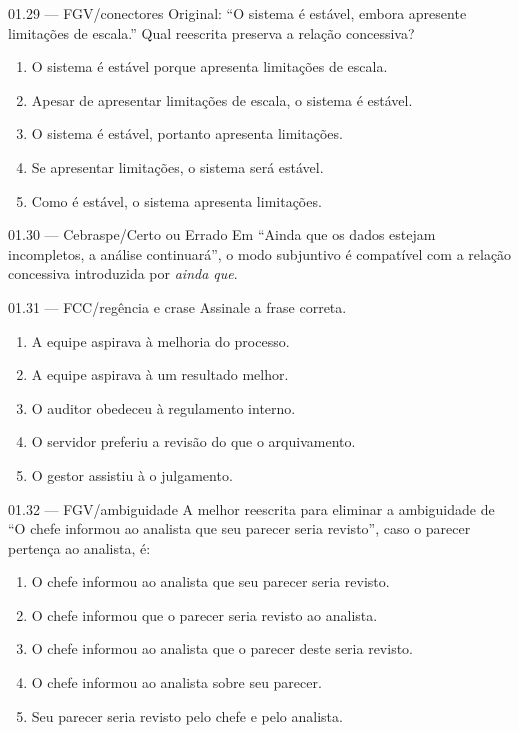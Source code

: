 \begin{questao}{ 01.29 — FGV/conectores}
Original: ``O sistema é estável, embora apresente limitações de escala.'' Qual reescrita preserva a relação concessiva?
\begin{enumerate}[label=\Alph*)]
\item O sistema é estável porque apresenta limitações de escala.
\item Apesar de apresentar limitações de escala, o sistema é estável.
\item O sistema é estável, portanto apresenta limitações.
\item Se apresentar limitações, o sistema será estável.
\item Como é estável, o sistema apresenta limitações.
\end{enumerate}
\end{questao}

\begin{questao}{ 01.30 — Cebraspe/Certo ou Errado}
Em ``Ainda que os dados estejam incompletos, a análise continuará'', o modo subjuntivo é compatível com a relação concessiva introduzida por \emph{ainda que}.
\end{questao}

\begin{questao}{ 01.31 — FCC/regência e crase}
Assinale a frase correta.
\begin{enumerate}[label=\Alph*)]
\item A equipe aspirava à melhoria do processo.
\item A equipe aspirava à um resultado melhor.
\item O auditor obedeceu à regulamento interno.
\item O servidor preferiu a revisão do que o arquivamento.
\item O gestor assistiu à o julgamento.
\end{enumerate}
\end{questao}

\begin{questao}{ 01.32 — FGV/ambiguidade}
A melhor reescrita para eliminar a ambiguidade de ``O chefe informou ao analista que seu parecer seria revisto'', caso o parecer pertença ao analista, é:
\begin{enumerate}[label=\Alph*)]
\item O chefe informou ao analista que seu parecer seria revisto.
\item O chefe informou que o parecer seria revisto ao analista.
\item O chefe informou ao analista que o parecer deste seria revisto.
\item O chefe informou ao analista sobre seu parecer.
\item Seu parecer seria revisto pelo chefe e pelo analista.
\end{enumerate}
\end{questao}

